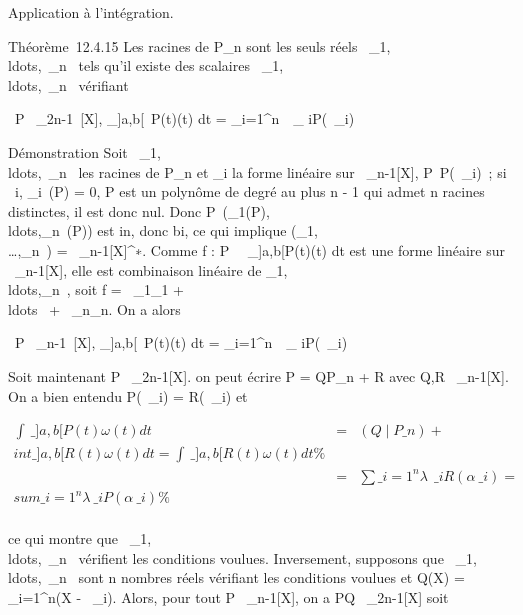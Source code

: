 \documentclass[]{article}
\begin{document}
Application à l'intégration.

Théorème~12.4.15 Les racines de P\_n sont les seuls réels
\alpha~\_1,\\ldots,\alpha~\_n~
tels qu'il existe des scalaires
\lambda~\_1,\\ldots,\lambda~\_n~
vérifiant

\forall~P \in {}~\_2n-1~{[}X{]},
\int  \_{]}a,b{[}~P(t)\omega(t) dt =
\sum \_i=1^n\lambda~~\_
iP(\alpha~\_i)

Démonstration Soit
\alpha~\_1,\\ldots,\alpha~\_n~
les racines de P\_n et \epsilon\_i la forme linéaire sur
~\_n-1{[}X{]}, P\mapsto~P(\alpha~\_i)~; si
\forall~i, \epsilon\_i~(P) = 0, P est un polynôme de
degré au plus n - 1 qui admet n racines distinctes, il est donc nul.
Donc
P\mapsto~(\epsilon\_1(P),\\ldots,\epsilon\_n~(P))
est in\jmathective, donc bi\jmathective, ce qui implique
\mathrmVect(\epsilon\_1,\\\ldots,\epsilon\_n~)
= ~\_n-1{[}X{]}^∗. Comme f :
P\mapsto~\int ~
\_{]}a,b{[}P(t)\omega(t) dt est une forme linéaire sur
~\_n-1{[}X{]}, elle est combinaison linéaire de
\epsilon\_1,\\ldots,\epsilon\_n~,
soit f = \lambda~\_1\epsilon\_1 +
\\ldots~ +
\lambda~\_n\epsilon\_n. On a alors

\forall~P \in {}~\_n-1~{[}X{]},
\int  \_{]}a,b{[}~P(t)\omega(t) dt =
\sum \_i=1^n\lambda~~\_
iP(\alpha~\_i)

Soit maintenant P \in {}~\_2n-1{[}X{]}. on peut écrire P =
QP\_n + R avec Q,R \in {}~\_n-1{[}X{]}. On a bien entendu
P(\alpha~\_i) = R(\alpha~\_i) et

\begin{align*} \int ~
\_{]}a,b{[}P(t)\omega(t) dt& =&
(Q∣P\_n) +\\int
 \_{]}a,b{[}R(t)\omega(t) dt =\int ~
\_{]}a,b{[}R(t)\omega(t) dt\%& \\ & =&
\sum \_i=1^n\lambda~~\_
iR(\alpha~\_i) = \\sum
\_i=1^n\lambda~\_ iP(\alpha~\_i) \%&
\\ \end{align*}

ce qui montre que
\alpha~\_1,\\ldots,\alpha~\_n~
vérifient les conditions voulues. Inversement, supposons que
\alpha~\_1,\\ldots,\alpha~\_n~
sont n nombres réels vérifiant les conditions voulues et Q(X)
= \∏ ~
\_i=1^n(X - \alpha~\_i). Alors, pour tout P \in
{}~\_n-1{[}X{]}, on a PQ \in {}~\_2n-1{[}X{]} soit
\end{document}
